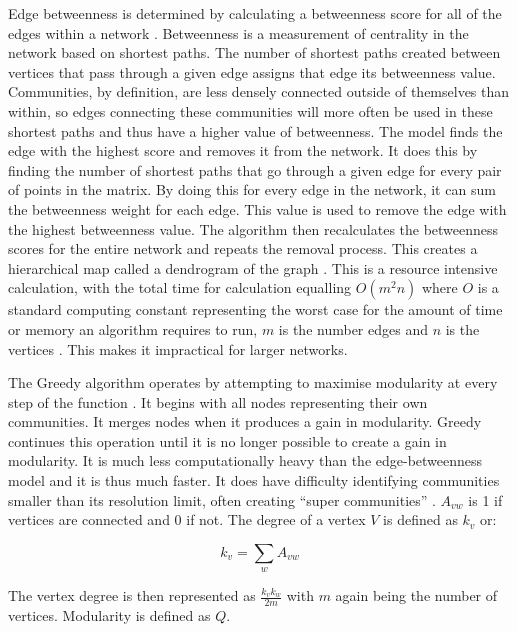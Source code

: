 \documentclass[11pt]{article}
\begin{document}
\par Edge betweenness is determined by calculating a betweenness score for all of the edges within a network \citep{Newman2003}⁠.   Betweenness is a measurement of centrality in the network based on shortest paths.  The number of shortest paths created between vertices that pass through a given edge assigns that edge its betweenness value.  Communities, by definition, are less densely connected outside of themselves than within, so edges connecting these communities will more often be used in these shortest paths and thus have a higher value of betweenness.  The model finds the edge with the highest score and removes it from the network.  It does this by finding the number of shortest paths that go through a given edge for every pair of points in the matrix.  By doing this for every edge in the network, it can sum the betweenness weight for each edge.  This value is used to remove the edge with the highest betweenness value.  The algorithm then recalculates the betweenness scores for the entire network and repeats the removal process.  This creates a hierarchical map called a dendrogram of the graph \citep{IGRAPH}.  This is a resource intensive calculation, with the total time for calculation equalling $O(m^2n)$ where $O$ is a standard computing constant representing the worst case for the amount of time or memory an algorithm requires to run, $m$ is the number edges and $n$ is the vertices \citep{Newman2003}. This makes it impractical for larger networks.      
\par The Greedy algorithm operates by attempting to maximise modularity at every step of the function \citep{Clauset2004}⁠.  It begins with all nodes representing their own communities.  It merges nodes when it produces a gain in modularity.  Greedy continues this operation until it is no longer possible to create a gain in modularity.  It is much less computationally heavy than the edge-betweenness model and it is thus much faster.  It does have difficulty identifying communities smaller than its resolution limit, often creating “super communities” \citep{Blondel2008}⁠.  
$A_{vw}$ is 1 if vertices are connected and 0 if not.  The degree of a vertex $V$ is defined as $k_{v}$ or:


    \begin{equation}
    k_{v}=\sum_{w}A_{vw}
    \end{equation}
    
The vertex degree is then represented as $\frac{k_{v}k_{w}}{2m}$ with $m$ again being the number of vertices.  Modularity is defined as $Q$.
\end{document}
